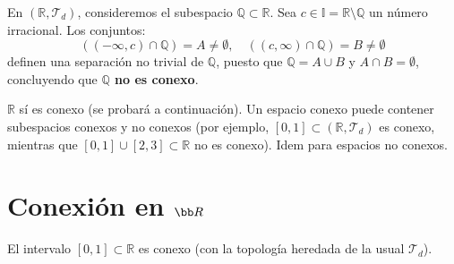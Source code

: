 \begin{ejem}
En $(\mathbb{R}, \mathcal{T}_d)$, consideremos el subespacio $\mathbb{Q} \subset \mathbb{R}$. Sea $c \in \mathbb{I} = \mathbb{R} \setminus \mathbb{Q}$ un número irracional. Los conjuntos:
\[
((-\infty, c) \cap \mathbb{Q}) = A \neq \emptyset, \quad ((c, \infty) \cap \mathbb{Q}) = B \neq \emptyset
\]
definen una separación no trivial de $\mathbb{Q}$, puesto que $\mathbb{Q} = A \cup B$ y $A \cap B = \emptyset$, concluyendo que \textbf{$\mathbb{Q}$ no es conexo}.
\end{ejem}

\begin{obs}
$\mathbb{R}$ sí es conexo (se probará a continuación). Un espacio conexo puede contener subespacios conexos y no conexos (por ejemplo, $[0, 1] \subset (\mathbb{R}, \mathcal{T}_d)$ es conexo, mientras que $[0, 1] \cup [2, 3] \subset \mathbb{R}$ no es conexo). Idem para espacios no conexos.
\end{obs}

\section{Conexi\'on en $\bb R$}

\begin{prop}
El intervalo $[0, 1] \subset \mathbb{R}$ es conexo (con la topología heredada de la usual $\mathcal{T}_d$).
\end{prop}

